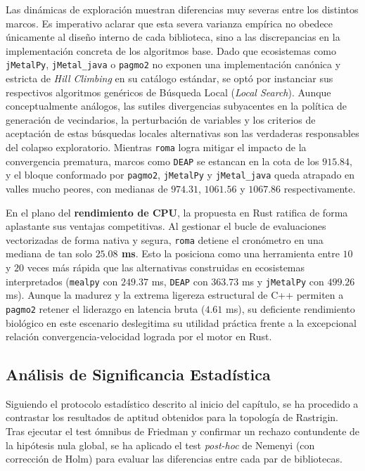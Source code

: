 \documentclass[12pt,a4paper,twoside,openright]{book}
\begin{document}
    Las dinámicas de exploración muestran diferencias muy severas entre los distintos marcos. Es imperativo aclarar que esta severa varianza empírica no obedece únicamente al diseño interno de cada biblioteca, sino a las discrepancias en la implementación concreta de los algoritmos base. Dado que ecosistemas como \texttt{jMetalPy}, \texttt{jMetal\_java} o \texttt{pagmo2} no exponen una implementación canónica y estricta de \textit{Hill Climbing} en su catálogo estándar, se optó por instanciar sus respectivos algoritmos genéricos de Búsqueda Local (\textit{Local Search}). Aunque conceptualmente análogos, las sutiles divergencias subyacentes en la política de generación de vecindarios, la perturbación de variables y los criterios de aceptación de estas búsquedas locales alternativas son las verdaderas responsables del colapso exploratorio. Mientras \texttt{roma} logra mitigar el impacto de la convergencia prematura, marcos como \texttt{DEAP} se estancan en la cota de los $915.84$, y el bloque conformado por \texttt{pagmo2}, \texttt{jMetalPy} y \texttt{jMetal\_java} queda atrapado en valles mucho peores, con medianas de $974.31$, $1061.56$ y $1067.86$ respectivamente.

    En el plano del \textbf{rendimiento de CPU}, la propuesta en Rust ratifica de forma aplastante sus ventajas competitivas. Al gestionar el bucle de evaluaciones vectorizadas de forma nativa y segura, \texttt{roma} detiene el cronómetro en una mediana de tan solo \textbf{$25.08$ ms}. Esto la posiciona como una herramienta entre $10$ y $20$ veces más rápida que las alternativas construidas en ecosistemas interpretados (\texttt{mealpy} con $249.37$ ms, \texttt{DEAP} con $363.73$ ms y \texttt{jMetalPy} con $499.26$ ms). Aunque la madurez y la extrema ligereza estructural de C++ permiten a \texttt{pagmo2} retener el liderazgo en latencia bruta ($4.61$ ms), su deficiente rendimiento biológico en este escenario deslegitima su utilidad práctica frente a la excepcional relación convergencia-velocidad lograda por el motor en Rust.
    
\subsection{Análisis de Significancia Estadística}
    Siguiendo el protocolo estadístico descrito al inicio del capítulo, se ha procedido a contrastar los resultados de aptitud obtenidos para la topología de Rastrigin. Tras ejecutar el test ómnibus de Friedman y confirmar un rechazo contundente de la hipótesis nula global, se ha aplicado el test \textit{post-hoc} de Nemenyi (con corrección de Holm) para evaluar las diferencias entre cada par de bibliotecas.
\end{document}
